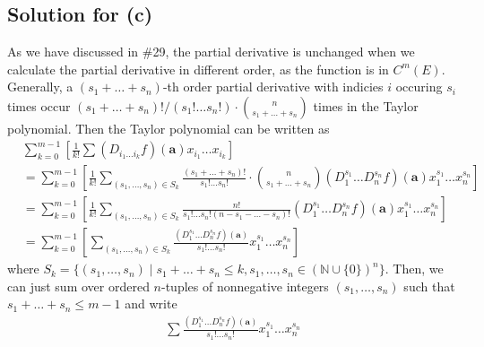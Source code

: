 \documentclass{scrartcl}
\begin{document}
\subsection{Solution for (c)}
As we have discussed in \#29, the partial derivative is unchanged when we
calculate the partial derivative in different order, as the function is in
\(C^m(E)\). Generally, a \((s_1 + \dots + s_n)\)-th order partial derivative
with indicies \(i\) occuring \(s_i\) times occur \((s_1 + \dots + s_n)! / (s_1!
\dots s_n!) \cdot {n \choose s_1 + \dots + s_n}\) times in the Taylor
polynomial. Then the Taylor polynomial can be written as
\begin{align*}
  &\sum^{m - 1}_{k = 0}
    \left[ \frac{1}{k!}
      \sum (D_{i_1 \dots i_k} f) (\mathbf{a}) x_{i_1} \dots x_{i_k} \right] \\
  &= \sum^{m - 1}_{k = 0}
    \left[ \frac{1}{k!} \sum_{(s_1, \dots, s_n) \in S_k}
      \frac{(s_1 + \dots + s_n)!}{s_1! \dots s_n!}
      \cdot {n \choose s_1 + \dots + s_n}
      (D^{s_1}_1 \dots D^{s_n}_n f) (\mathbf{a}) x^{s_1}_1 \dots x^{s_n}_n
    \right] \\
  &= \sum^{m - 1}_{k = 0}
    \left[ \frac{1}{k!} \sum_{(s_1, \dots, s_n) \in S_k}
      \frac{n!}{s_1! \dots s_n! (n - s_1 - \dots - s_n)!}
      (D^{s_1}_1 \dots D^{s_n}_n f) (\mathbf{a}) x^{s_1}_1 \dots x^{s_n}_n
    \right] \\
  &= \sum^{m - 1}_{k = 0}
    \left[ \sum_{(s_1, \dots, s_n) \in S_k}
      \frac{(D^{s_1}_1 \dots D^{s_n}_n f) (\mathbf{a})}{s_1! \dots s_n!}
      x^{s_1}_1 \dots x^{s_n}_n
    \right]
\end{align*}
where \(S_k = \{(s_1, \dots, s_n)\; |\; s_1 + \dots + s_n \le k, s_1, \dots,
s_n \in (\mathbb{N} \cup \{0\})^n\}\). Then, we can just sum over ordered
\(n\)-tuples of nonnegative integers \((s_1, \dots, s_n)\) such that \(s_1 +
\dots + s_n \le m - 1\) and write
\begin{align*}
  \sum \frac{(D^{s_1}_1 \dots D^{s_n}_n f) (\mathbf{a})}{s_1! \dots s_n!}
    x^{s_1}_1 \dots x^{s_n}_n
\end{align*}
\end{document}
